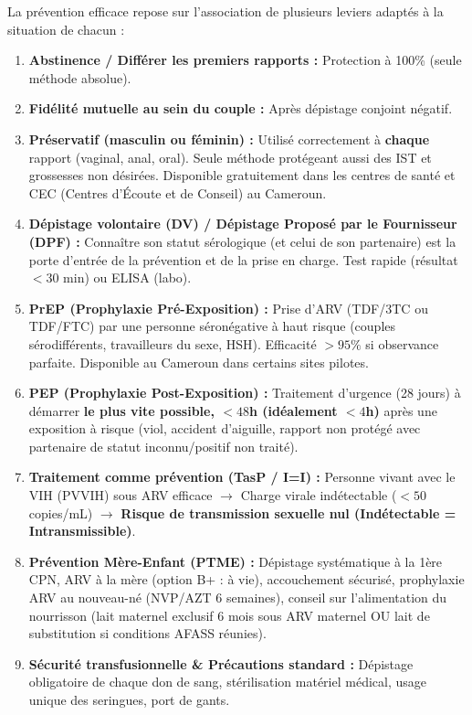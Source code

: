\documentclass[11pt]{article}
\begin{document}
\begin{methode}
La prévention efficace repose sur l'association de plusieurs leviers adaptés à la situation de chacun :
\begin{enumerate}
    \item \textbf{Abstinence / Différer les premiers rapports :} Protection à 100\% (seule méthode absolue).
    \item \textbf{Fidélité mutuelle au sein du couple :} Après dépistage conjoint négatif.
    \item \textbf{Préservatif (masculin ou féminin) :} Utilisé correctement à \textbf{chaque} rapport (vaginal, anal, oral). Seule méthode protégeant aussi des IST et grossesses non désirées. Disponible gratuitement dans les centres de santé et CEC (Centres d'Écoute et de Conseil) au Cameroun.
    \item \textbf{Dépistage volontaire (DV) / Dépistage Proposé par le Fournisseur (DPF) :} Connaître son statut sérologique (et celui de son partenaire) est la porte d'entrée de la prévention et de la prise en charge. Test rapide (résultat $< 30$ min) ou ELISA (labo).
    \item \textbf{PrEP (Prophylaxie Pré-Exposition) :} Prise d'ARV (TDF/3TC ou TDF/FTC) par une personne séronégative à haut risque (couples sérodifférents, travailleurs du sexe, HSH). Efficacité $> 95\%$ si observance parfaite. Disponible au Cameroun dans certains sites pilotes.
    \item \textbf{PEP (Prophylaxie Post-Exposition) :} Traitement d'urgence (28 jours) à démarrer \textbf{le plus vite possible, $< 48$h (idéalement $< 4$h)} après une exposition à risque (viol, accident d'aiguille, rapport non protégé avec partenaire de statut inconnu/positif non traité).
    \item \textbf{Traitement comme prévention (TasP / I=I) :} Personne vivant avec le VIH (PVVIH) sous ARV efficace $\to$ Charge virale indétectable ($< 50$ copies/mL) $\to$ \textbf{Risque de transmission sexuelle nul (Indétectable = Intransmissible)}.
    \item \textbf{Prévention Mère-Enfant (PTME) :} Dépistage systématique à la 1ère CPN, ARV à la mère (option B+ : à vie), accouchement sécurisé, prophylaxie ARV au nouveau-né (NVP/AZT 6 semaines), conseil sur l'alimentation du nourrisson (lait maternel exclusif 6 mois sous ARV maternel OU lait de substitution si conditions AFASS réunies).
    \item \textbf{Sécurité transfusionnelle \& Précautions standard :} Dépistage obligatoire de chaque don de sang, stérilisation matériel médical, usage unique des seringues, port de gants.
\end{enumerate}
\end{methode}
\end{document}
